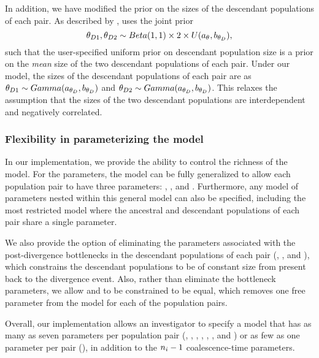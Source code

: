 In addition, we have modified the prior on the sizes of the descendant
populations of each pair.
As described by \citet{Oaks2012}, \msb uses the joint prior
\begin{equation}
    \descendantTheta{1}{}, \descendantTheta{2}{} \sim
    Beta(1,1) \times 2 \times U(\uniformMin{\myTheta{}},
    \uniformMax{\descendantTheta{}{}}),
    \label{eq:jointThetaPrior}
\end{equation}
such that the user-specified uniform prior on descendant population
size is a prior on the \emph{mean} size of the two descendant
populations of each pair.
Under our model, the sizes of the descendant populations of each
pair are \iid as
$\descendantTheta{1}{} \sim Gamma(\gammaShape{\descendantTheta{}{}},
\gammaScale{\descendantTheta{}{}})$
and
$\descendantTheta{2}{} \sim Gamma(\gammaShape{\descendantTheta{}{}},
\gammaScale{\descendantTheta{}{}})$.
This relaxes the assumption that the sizes of the two descendant populations
are interdependent and negatively correlated.

\subsubsection*{Flexibility in parameterizing the model}
In our implementation, we provide the ability to control the richness of the
model.
For the \myTheta{} parameters, the model can be fully generalized to
allow each population pair to have three parameters:
\ancestralTheta{}, , and .
Furthermore, any model of \myTheta{} parameters nested within this
general model can also be specified, including the most restricted model
where the ancestral and descendant populations of each pair share
a single \myTheta{} parameter.

We also provide the option of eliminating the parameters associated with the
post-divergence bottlenecks in the descendant populations of each pair
(\bottleTime{}, , and ),
which constrains the descendant populations to be of
constant size from present back to the divergence event.
Also, rather than eliminate the bottleneck parameters,
we allow  and  to be constrained to be
equal, which removes one free parameter from the model for each of the
population pairs.

Overall, our implementation allows an investigator to specify a model that has
as many as seven parameters per population pair
(\ancestralTheta{}, , ,
\bottleTime{}, , , and
\migrationRate{})
or as few as one parameter per pair
(\myTheta{}),
in addition to the $\popSampleSize{i}{} - 1$ coalescence-time parameters.

